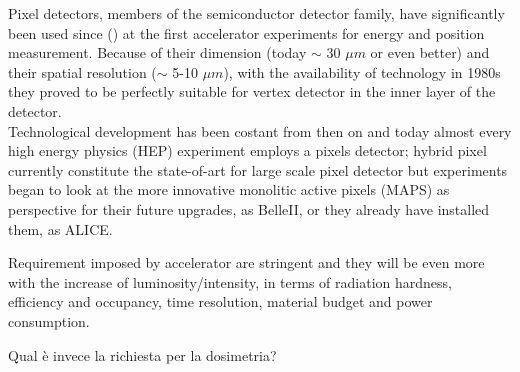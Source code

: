 Pixel detectors, members of the semiconductor detector family, have significantly been used since () at the first accelerator experiments for energy and position measurement.
Because of their dimension (today $\sim$ 30 $\mu m$ or even better) and their spatial resolution ($\sim$ 5-10 $\mu m$), with the availability of technology in 1980s they proved to be perfectly suitable for vertex detector in the inner layer of the detector.\\
Technological development has been costant from then on and today almost every high energy physics (HEP) experiment employs a pixels detector; hybrid pixel currently constitute the state-of-art for large scale pixel detector but experiments began to look at the more innovative monolitic active pixels (MAPS) as perspective for their future upgrades, as BelleII, or they already have installed them, as ALICE.

Requirement imposed by accelerator are stringent and they will be even more with the increase of luminosity/intensity, in terms of radiation hardness, efficiency and occupancy, time resolution, material budget and power consumption.

Qual è invece la richiesta per la dosimetria? \\



